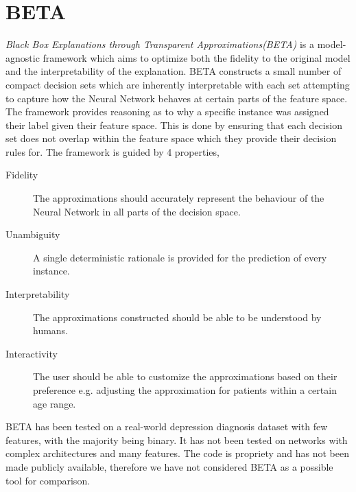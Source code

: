 \section{BETA}
\emph{Black Box Explanations through Transparent Approximations(BETA)} \cite{DBLP:journals/corr/LakkarajuKCL17} is a model-agnostic framework which aims to optimize both the fidelity to the original model and the interpretability of the explanation. BETA constructs a small number of compact decision sets which are inherently interpretable \cite{inproceedingsb}  with each set attempting to capture how the Neural Network behaves at certain parts of the feature space. The framework provides reasoning as to why a specific instance was assigned their label given their feature space. This is done by ensuring that each decision set does not overlap within the feature space which they provide their decision rules for. The framework is guided by 4 properties,

\begin{description}
    \item[Fidelity] The approximations should accurately represent the behaviour of the Neural Network in all parts of the decision space.
    \item[Unambiguity] A single deterministic rationale is provided for the prediction of every instance.
    \item[Interpretability] The approximations constructed should be able to be understood by humans.
    \item[Interactivity] The user should be able to customize the approximations based on their preference e.g. adjusting the approximation for patients within a certain age range.
\end{description}
BETA has been tested on a real-world depression diagnosis dataset with few features, with the majority being binary. It has not been tested on networks with complex architectures and many features. The code is propriety and has not been made publicly available, therefore we have not considered BETA as a possible tool for comparison.


